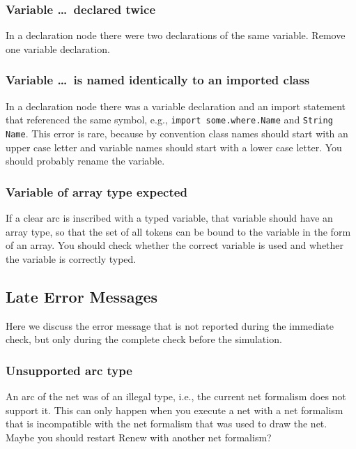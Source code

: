 \subsubsection{Variable \dots\ declared twice}

In a declaration node there were two declarations
of the same variable. Remove one variable declaration.

\subsubsection{Variable \dots\ is named identically to an imported class}

In a declaration node there was a variable declaration and
an import statement that referenced the same symbol, e.g.,
\texttt{import some.where.Name} and \texttt{String Name}.
This error is rare, because by convention class names should start
with an upper case letter and variable names should start with
a lower case letter. You should probably rename the variable.

\subsubsection{Variable of array type expected}

If a clear arc is inscribed with a typed variable,
that variable should have an array type, so that
the set of all tokens can be bound to the variable
in the form of an array. You should check whether the
correct variable is used and whether the variable is correctly
typed.


\subsection{Late Error Messages}

Here we discuss the error message that is not reported
during the immediate check, but only during the complete
check before the simulation.


\subsubsection{Unsupported arc type}

An arc of the net was of an illegal type, i.e., the
current net formalism does not support it. This can only
happen when you execute a net with a net formalism that is incompatible
with the net formalism that was used to draw the net.
Maybe you should restart Renew with another net formalism?



